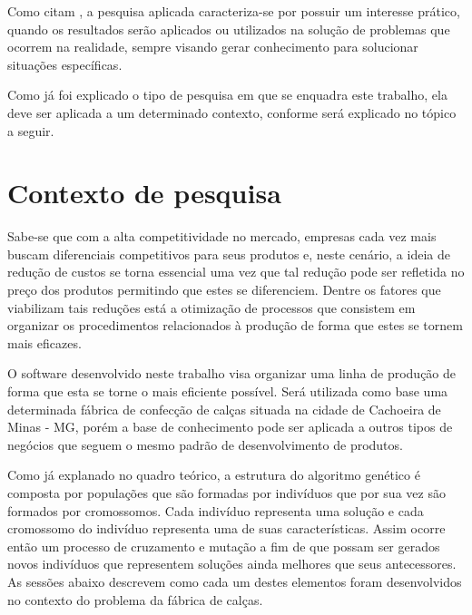 \par Como citam , a pesquisa aplicada
caracteriza-se por possuir um interesse prático, quando os resultados serão aplicados ou utilizados na
solução de problemas que ocorrem na realidade, sempre visando gerar conhecimento
para solucionar situações específicas.

\par Como já foi explicado o tipo de pesquisa em que se enquadra este trabalho,
ela deve ser aplicada a um determinado contexto, conforme será explicado no
tópico a seguir.

\section{Contexto de pesquisa}



\par Sabe-se que com a alta competitividade no mercado, empresas cada vez mais
buscam diferenciais competitivos para seus produtos e, neste cenário, a ideia
de redução de custos se torna essencial uma vez que tal redução pode ser
refletida no preço dos produtos permitindo que estes se diferenciem. Dentre
os fatores que viabilizam tais reduções está a otimização de processos que
consistem em organizar os procedimentos relacionados à produção de forma que
estes se tornem mais eficazes.

\par O software desenvolvido neste trabalho visa organizar uma linha de produção
de forma que esta se torne o mais eficiente possível. Será utilizada como
base uma determinada fábrica de confecção de calças situada na cidade de
Cachoeira de Minas - MG, porém a base de conhecimento pode ser aplicada a outros
tipos de negócios que seguem o mesmo padrão de desenvolvimento de produtos.

\par Como já explanado no quadro teórico, a estrutura do algoritmo genético é composta
por populações que são formadas por indivíduos que por sua vez são formados por cromossomos.
Cada indivíduo representa uma solução e cada cromossomo do indivíduo representa uma de suas características. 
Assim ocorre então um processo de cruzamento e mutação a fim de que possam ser gerados novos 
indivíduos que representem soluções ainda melhores que seus antecessores.
As sessões abaixo descrevem como cada um destes elementos foram desenvolvidos no contexto do problema da fábrica de calças.

